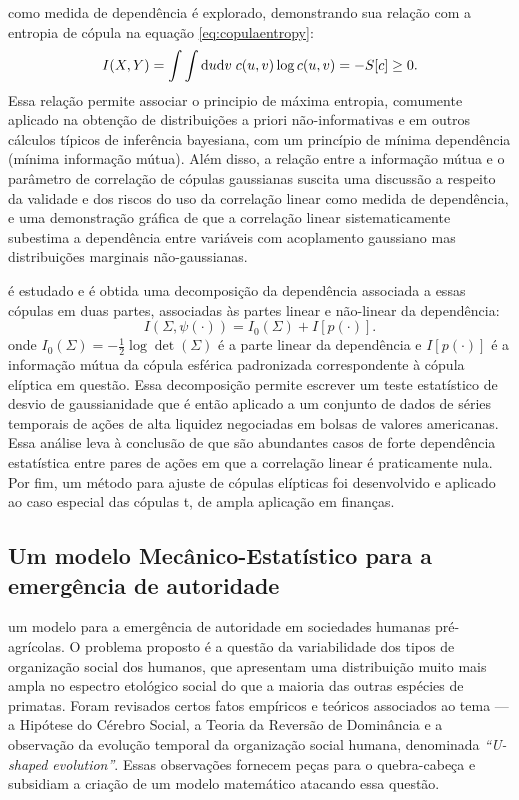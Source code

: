  como medida de dependência é explorado, demonstrando sua relação com a entropia de cópula na equação \eqref{eq:copulaentropy}:
\begin{equation}
I(X,Y) = \int \int \mathrm{d} u \mathrm{d} v \; c(u,v) \log c(u,v)  = - S[c] \ge 0.
\end{equation}
Essa relação permite associar o principio de máxima entropia, comumente aplicado na obtenção de distribuições a priori não-informativas e em outros cálculos típicos de inferência bayesiana, com um princípio de mínima dependência (mínima informação mútua). Além disso, a relação entre a informação mútua e o parâmetro de correlação de cópulas gaussianas suscita uma discussão a respeito da validade e dos riscos do uso da correlação linear como medida de dependência, e uma demonstração gráfica de que a correlação linear sistematicamente subestima a dependência entre variáveis com acoplamento gaussiano mas distribuições marginais não-gaussianas. 

 é estudado e é obtida uma decomposição da dependência associada a essas cópulas em duas partes, associadas às partes linear e não-linear da dependência:
\begin{equation}
  I(\Sigma, \psi(\cdot)) = I_{0}(\Sigma) + I[p(\cdot)].
\end{equation}
onde $I_{0}(\Sigma) = -\frac{1}{2}\log\det(\Sigma)$ é a parte linear da dependência e $I[p(\cdot)]$ é a informação mútua da cópula esférica padronizada correspondente à cópula elíptica em questão. Essa decomposição permite escrever um teste estatístico de desvio de gaussianidade que é então aplicado a um conjunto de dados de séries temporais de ações de alta liquidez negociadas em bolsas de valores americanas. Essa análise leva à conclusão de que são abundantes casos de forte dependência estatística entre pares de ações em que a correlação linear é praticamente nula. Por fim, um método para ajuste de cópulas elípticas foi desenvolvido e aplicado ao caso especial das cópulas t, de ampla aplicação em finanças.

\subsection{Um modelo Mecânico-Estatístico para a emergência de autoridade}

 um modelo para a emergência de autoridade em sociedades humanas pré-agrícolas. O problema proposto é a questão da variabilidade dos tipos de organização social dos humanos, que apresentam uma distribuição muito mais ampla no espectro etológico social do que a maioria das outras espécies de primatas. Foram revisados certos fatos empíricos e teóricos associados ao tema --- a Hipótese do Cérebro Social, a Teoria da Reversão de Dominância e a observação da evolução temporal da organização social humana, denominada \textit{``U-shaped evolution''}. Essas observações fornecem peças para o quebra-cabeça e subsidiam a criação de um modelo matemático atacando essa questão. 


